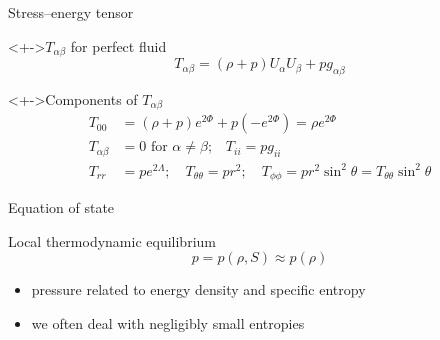 \documentclass{beamer}
\let\svthefootnote\thefootnote
\newcommand\blankfootnote[1]{%
  \let\thefootnote\relax\footnotetext{#1}%
  \let\thefootnote\svthefootnote%
}
\begin{document}
\begin{frame}{Stress--energy tensor}

\begin{block}<+->{$T_{\alpha\beta}$ for perfect fluid}
\begin{displaymath}
  T_{\alpha\beta} = (\rho + p) U_\alpha U_\beta + p g_{\alpha\beta}
\end{displaymath}
\end{block}

\begin{block}<+->{Components of $T_{\alpha\beta}$}
\begin{align*}
  T_{00} &= (\rho + p) e^{2\Phi} + p (-e^{2\Phi}) = \rho e^{2\Phi}
  \\
  T_{\alpha\beta} &= 0 \text{ for $\alpha \neq \beta$;}
  \quad
  T_{ii} = p g_{ii}
  \\
  T_{rr} &= p e^{2\Lambda};
  \quad
  T_{\theta\theta} = p r^2;
  \quad
  T_{\phi\phi} = p r^2 \sin^2\theta = T_{\theta\theta} \sin^2\theta
\end{align*}
\end{block}

\blankfootnote{\textcite[p. 260]{Schutz}}



\end{frame}


\begin{frame}{Equation of state}

\begin{block}{Local thermodynamic equilibrium}
\begin{displaymath}
  p = p(\rho, S) \approx p(\rho)
\end{displaymath}
\end{block}

\begin{itemize}
\item pressure related to energy density and specific entropy
\item we often deal with negligibly small entropies
\end{itemize}

\blankfootnote{\textcite[p. 261]{Schutz}}

\end{frame}
\end{document}
